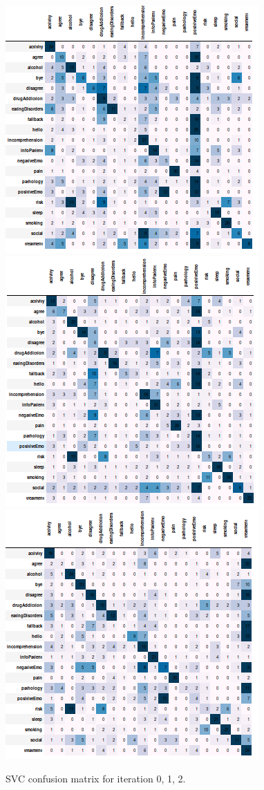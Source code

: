 \documentclass[11pt]{article}
\begin{document}
\begin{figure}[h]
	\centering
	\includegraphics[scale=0.3]{lsvc_0.png}
	\includegraphics[scale=0.3]{lsvc_1.png}
	\includegraphics[scale=0.3]{lsvc_2.png}
	\caption{SVC confusion matrix for iteration 0, 1, 2.}
\label{lda_gm_cm}
\end{figure}
\FloatBarrier
\end{document}
